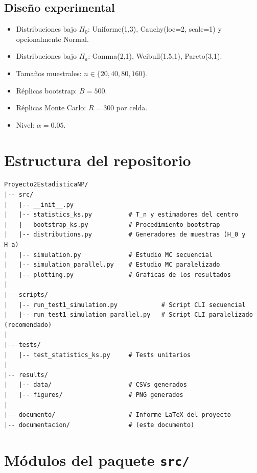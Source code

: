 \documentclass[11pt,a4paper]{article}
\begin{document}
\subsection{Diseño experimental}
\begin{itemize}[leftmargin=*]
    \item Distribuciones bajo $H_0$: Uniforme(1,3), Cauchy(loc=2, scale=1) y opcionalmente Normal.
    \item Distribuciones bajo $H_a$: Gamma(2,1), Weibull(1.5,1), Pareto(3,1).
    \item Tamaños muestrales: $n \in \{20, 40, 80, 160\}$.
    \item Réplicas bootstrap: $B = 500$.
    \item Réplicas Monte Carlo: $R = 300$ por celda.
    \item Nivel: $\alpha = 0.05$.
\end{itemize}

\section{Estructura del repositorio}

\begin{lstlisting}[basicstyle=\ttfamily\small, frame=single, backgroundcolor=\color{codebg}]
Proyecto2EstadisticaNP/
|-- src/
|   |-- __init__.py
|   |-- statistics_ks.py          # T_n y estimadores del centro
|   |-- bootstrap_ks.py           # Procedimiento bootstrap
|   |-- distributions.py          # Generadores de muestras (H_0 y H_a)
|   |-- simulation.py             # Estudio MC secuencial
|   |-- simulation_parallel.py    # Estudio MC paralelizado
|   |-- plotting.py               # Graficas de los resultados
|
|-- scripts/
|   |-- run_test1_simulation.py            # Script CLI secuencial
|   |-- run_test1_simulation_parallel.py   # Script CLI paralelizado (recomendado)
|
|-- tests/
|   |-- test_statistics_ks.py     # Tests unitarios
|
|-- results/
|   |-- data/                     # CSVs generados
|   |-- figures/                  # PNG generados
|
|-- documento/                    # Informe LaTeX del proyecto
|-- documentacion/                # (este documento)
\end{lstlisting}

\section{Módulos del paquete \texttt{src/}}
\end{document}
